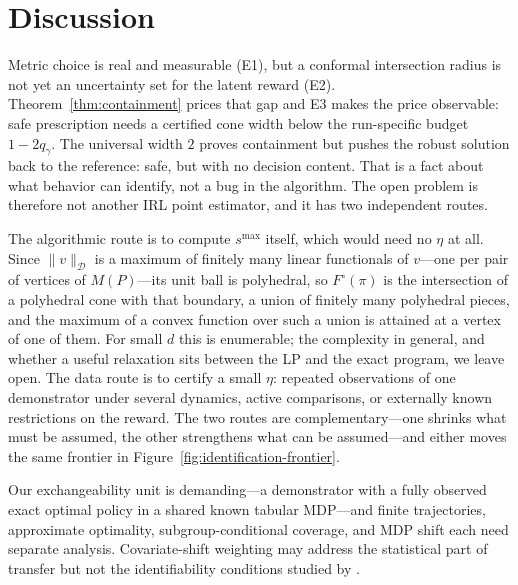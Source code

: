 \documentclass{article}
\newcommand{\Dnorm}[1]{\|#1\|_{\mathcal D}}
\begin{document}
\section{Discussion}
\label{sec:discussion}

Metric choice is real and measurable (E1), but a conformal intersection radius
is not yet an uncertainty set for the latent reward (E2).
Theorem~\ref{thm:containment} prices that gap and E3 makes the price
observable: safe prescription needs a certified cone width below the
run-specific budget $1-2q_\gamma$. The universal width $2$ proves containment
but pushes the robust solution back to the reference: safe, but with no
decision content. That is a fact about what behavior can identify, not a bug in
the algorithm. The open problem is therefore not another IRL point estimator,
and it has two independent routes.

The algorithmic route is to compute $s^{\max}$ itself, which would need no
$\eta$ at all. Since $\Dnorm{v}$ is a maximum of finitely many linear
functionals of $v$---one per pair of vertices of $M(P)$---its unit ball is
polyhedral, so $F^\circ(\pi)$ is the intersection of a polyhedral cone with that
boundary, a union of finitely many polyhedral pieces, and the maximum of a
convex function over such a union is attained at a vertex of one of them. For
small $d$ this is enumerable; the complexity in general, and whether a useful
relaxation sits between the LP and the exact program, we leave open. The data
route is to certify a small $\eta$: repeated observations of one demonstrator
under several dynamics, active comparisons, or externally known restrictions on
the reward. The two routes are complementary---one shrinks what must be
assumed, the other strengthens what can be assumed---and either moves the same
frontier in Figure~\ref{fig:identification-frontier}.

Our exchangeability unit is demanding---a demonstrator with a fully observed
exact optimal policy in a shared known tabular MDP---and finite trajectories,
approximate optimality, subgroup-conditional coverage, and MDP shift each need separate
analysis. Covariate-shift weighting \citep{tibshirani2019conformal} may address
the statistical part of transfer but not the identifiability conditions studied
by \citet{schlaginhaufen2024towards}.
\end{document}
